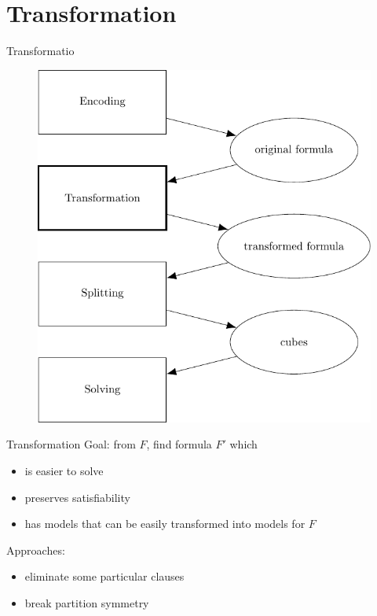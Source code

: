 \documentclass[c,8pt,xcolor...,x11names,usenames,dvipsnames]{beamer}
\begin{document}
\section{Transformation}

\begin{frame}{Transformatio}
	\begin{figure}
		\includegraphics[scale=0.65]{images/framework2}
	\end{figure}
\end{frame}

\begin{frame}{Transformation}
	Goal: from $F$, find formula $F'$ which
	\begin{itemize}
		\item is easier to solve
		\pause
		\item preserves satisfiability
		\pause
		\item has models that can be easily transformed into models for $F$
	\end{itemize}
	\vspace{5px}
	\pause
	Approaches:
	\begin{itemize}
		\item eliminate some particular clauses
		\pause
		\item break partition symmetry
	\end{itemize}
\end{frame}
\end{document}
